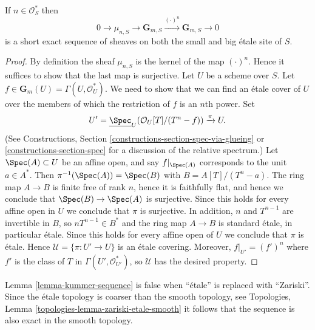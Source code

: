\begin{lemma}
\label{lemma-kummer-sequence}
If $n\in \mathcal{O}_S^*$ then
$$
0 \to
\mu_{n, S} \to
\mathbf{G}_{m, S} \xrightarrow{(\cdot)^n}
\mathbf{G}_{m, S} \to 0
$$
is a short exact sequence of sheaves on both the small and
big \'etale site of $S$.
\end{lemma}

\begin{proof}
By definition the sheaf $\mu_{n, S}$ is the kernel of the map
$(\cdot)^n$. Hence it suffices to show that the last map is surjective.
Let $U$ be a scheme over $S$. Let
$f \in \mathbf{G}_m(U) = \Gamma(U, \mathcal{O}_U^*)$.
We need to show that we can find an \'etale cover of
$U$ over the members of which the restriction of $f$ is an $n$th power.
Set
$$
U' =
\underline{\Spec}_U(\mathcal{O}_U[T]/(T^n-f))
\xrightarrow{\pi}
U.
$$
(See
Constructions, Section \ref{constructions-section-spec-via-glueing} or
\ref{constructions-section-spec}
for a discussion of the relative spectrum.)
Let $\Spec(A) \subset U$ be an affine open, and say $f|_{\Spec(A)}$ corresponds
to the unit $a \in A^*$. Then $\pi^{-1}(\Spec(A)) = \Spec(B)$ with
$B = A[T]/(T^n - a)$. The ring map $A \to B$ is finite free of rank $n$,
hence it is faithfully flat, and hence we conclude that
$\Spec(B) \to \Spec(A)$ is surjective. Since this holds for every
affine open in $U$ we conclude that $\pi$ is surjective.
In addition, $n$ and $T^{n - 1}$ are invertible in $B$, so
$nT^{n-1} \in B^*$ and the ring map $A \to B$ is standard \'etale,
in particular \'etale. Since this holds for every affine open of $U$
we conclude that $\pi$ is \'etale. Hence
$\mathcal{U} = \{\pi : U' \to U\}$ is an \'etale covering.
Moreover, $f|_{U'} = (f')^n$ where $f'$ is the class of $T$
in $\Gamma(U', \mathcal{O}_{U'}^*)$, so $\mathcal{U}$ has the desired property.
\end{proof}

\begin{remark}
\label{remark-no-kummer-sequence-zariski}
Lemma \ref{lemma-kummer-sequence} is false when ``\'etale'' is replaced
with ``Zariski''.
Since the \'etale topology is coarser than the smooth topology, see
Topologies, Lemma \ref{topologies-lemma-zariski-etale-smooth}
it follows that the sequence is also exact in the smooth topology.
\end{remark}


